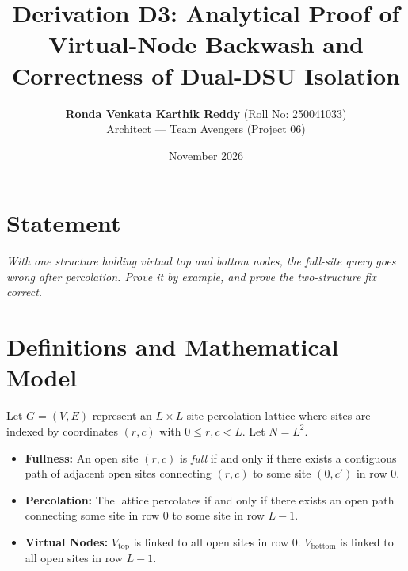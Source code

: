 \documentclass[11pt,a4paper]{article}
\title{\textbf{Derivation D3: Analytical Proof of Virtual-Node Backwash and Correctness of Dual-DSU Isolation}}
\author{\textbf{Ronda Venkata Karthik Reddy} (Roll No: 250041033) \\ Architect --- Team Avengers (Project 06)}
\date{November 2026}
\begin{document}
\maketitle

\section{Statement}
\textit{With one structure holding virtual top and bottom nodes, the full-site query goes wrong after percolation. Prove it by example, and prove the two-structure fix correct.}

\section{Definitions and Mathematical Model}
Let $G = (V, E)$ represent an $L \times L$ site percolation lattice where sites are indexed by coordinates $(r, c)$ with $0 \le r, c < L$. Let $N = L^2$.
\begin{itemize}
    \item \textbf{Fullness:} An open site $(r, c)$ is \textit{full} if and only if there exists a contiguous path of adjacent open sites connecting $(r, c)$ to some site $(0, c')$ in row $0$.
    \item \textbf{Percolation:} The lattice percolates if and only if there exists an open path connecting some site in row $0$ to some site in row $L-1$.
    \item \textbf{Virtual Nodes:} $V_{\text{top}}$ is linked to all open sites in row $0$. $V_{\text{bottom}}$ is linked to all open sites in row $L-1$.
\end{itemize}
\end{document}
